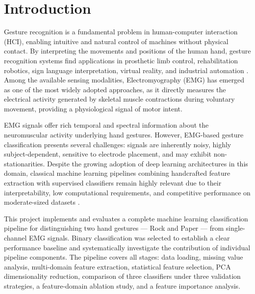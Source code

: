 \section{Introduction}

Gesture recognition is a fundamental problem in human-computer interaction (HCI), enabling
intuitive and natural control of machines without physical contact. By interpreting the movements
and positions of the human hand, gesture recognition systems find applications in prosthetic limb
control, rehabilitation robotics, sign language interpretation, virtual reality, and industrial
automation \citep{Phinyomark2012}. Among the available sensing modalities, Electromyography (EMG)
has emerged as one of the most widely adopted approaches, as it directly measures the electrical
activity generated by skeletal muscle contractions during voluntary movement, providing a
physiological signal of motor intent.

EMG signals offer rich temporal and spectral information about the neuromuscular activity
underlying hand gestures. However, EMG-based gesture classification presents several challenges:
signals are inherently noisy, highly subject-dependent, sensitive to electrode placement, and may
exhibit non-stationarities. Despite the growing adoption of deep learning architectures in this
domain, classical machine learning pipelines combining handcrafted feature extraction with
supervised classifiers remain highly relevant due to their interpretability, low computational
requirements, and competitive performance on moderate-sized datasets \citep{Atzori2016}.

This project implements and evaluates a complete machine learning classification pipeline for
distinguishing two hand gestures --- Rock and Paper --- from single-channel EMG signals. Binary
classification was selected to establish a clear performance baseline and systematically
investigate the contribution of individual pipeline components. The pipeline covers all stages:
data loading, missing value analysis, multi-domain feature extraction, statistical feature
selection, PCA dimensionality reduction, comparison of three classifiers under three validation
strategies, a feature-domain ablation study, and a feature importance analysis.
